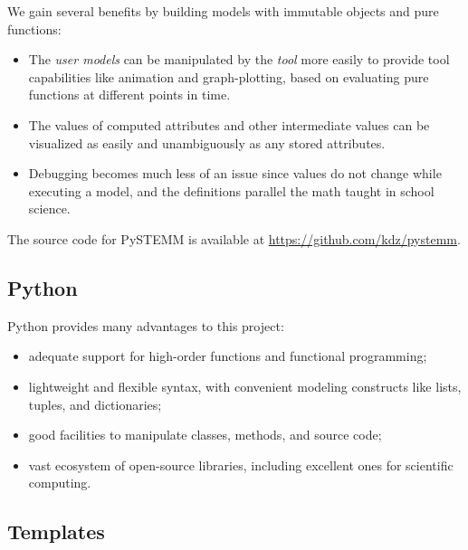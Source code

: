 \documentclass[letterpaper,compsoc,twoside]{IEEEtran}
\begin{document}
We gain several benefits by building models with immutable objects and pure functions:\begin{itemize}

\item 

The \emph{user models} can be manipulated by the \emph{tool} more easily to provide tool capabilities like animation and graph-plotting, based on evaluating pure functions at different points in time.
\item 

The values of computed attributes and other intermediate values can be visualized as easily and unambiguously as any stored attributes.
\item 

Debugging becomes much less of an issue since values do not change while executing a model, and the definitions parallel the math taught in school science.
\end{itemize}


The source code for PySTEMM is available at \url{https://github.com/kdz/pystemm}.



\subsection{Python\label{python}}


Python provides many advantages to this project:\begin{itemize}

\item 

adequate support for high-order functions and functional programming;
\item 

lightweight and flexible syntax, with convenient modeling constructs like lists, tuples, and dictionaries;
\item 

good facilities to manipulate classes, methods, and source code;
\item 

vast ecosystem of open-source libraries, including excellent ones for scientific computing.
\end{itemize}


\subsection{Templates\label{templates}}
\end{document}
